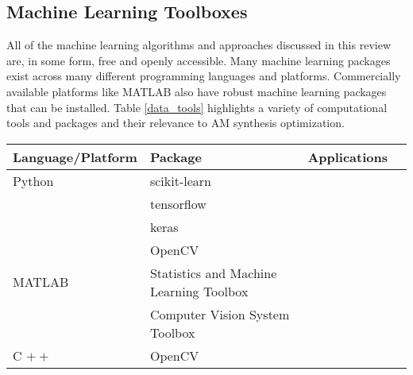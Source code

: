 \subsection{Machine Learning Toolboxes}
All of the machine learning algorithms and approaches discussed in this review are, in some form, free and openly accessible. Many machine learning packages exist across many different programming languages and platforms. Commercially available platforms like MATLAB also have robust machine learning packages that can be installed. Table \ref{data_tools} highlights a variety of computational tools and packages and their relevance to AM synthesis optimization. 

\begin{table*}
    \renewcommand{\arraystretch}{0.8}
    \setlength{\tabcolsep}{5pt}
    \begin{center}
        \begin{tabular}{@{}llll@{}}
            \toprule
            Language/Platform & Package & Applications  \\ \midrule 
            \hline
            \hline
            Python & scikit-learn & \\
            		& tensorflow & \\
			& keras & \\
			& OpenCV & \\
	   MATLAB & Statistics and Machine Learning Toolbox & \\
	   		& Computer Vision System Toolbox & \\
	  C $++$ & OpenCV & \\
            \hline
            \bottomrule
        \end{tabular}
        \caption{ }
        \label{data_tools}
    \end{center}
\end{table*}

